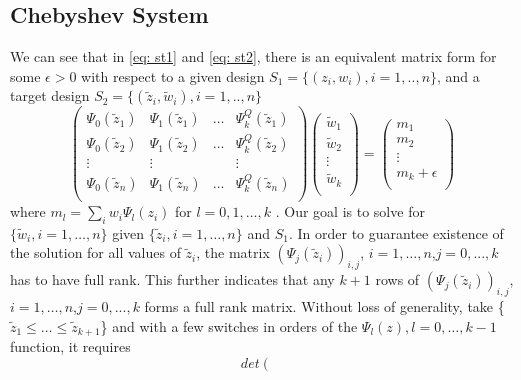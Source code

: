 \documentclass[11pt]{amsart}
\theoremstyle{definition}
\theoremstyle{remark}
\begin{document}
\subsection{Chebyshev System}We can see that in \eqref{eq: st1} and \eqref{eq: st2},  there is an equivalent matrix form for some $\epsilon>0$ with respect to a given design $S_1 = \{(z_i, w_i), i=1,..,n\} $, and a target design  $S_2 = \{(\tilde{z}_i, \tilde{w}_i), i=1,..,n\}$
\begin{equation}\label{eq: tsys1}
\left ( \begin{array}{cccc}

\Psi_{0}(\tilde{z}_1) &\Psi_{1}(\tilde{z}_1)&\ldots &\Psi_{k}^Q(\tilde{z}_1)\\
\Psi_{0}(\tilde{z}_2) &\Psi_{1}(\tilde{z}_2)&\ldots &\Psi_{k}^Q(\tilde{z}_2)\\
\vdots & \vdots &&\vdots\\
\Psi_{0}(\tilde{z}_n) &\Psi_{1}(\tilde{z}_n)&\ldots &\Psi_{k}^Q(\tilde{z}_n)\\
\end{array}\right) \left(\begin{array}{c}
  \tilde{w}_1    \\
   \tilde{w}_2    \\
   \vdots\\
    \tilde{w}_k    \\
      
\end{array}\right) = \left(\begin{array}{c}
  m_1    \\
   m_2    \\
   \vdots\\
    m_k+\epsilon    \\
      
\end{array}\right) 
\end{equation} where $m_l = \sum_{i}w_i\Psi_l(z_i)$ for $l=0,1,\ldots,k$ . Our goal is to solve for $\{\tilde{w}_i, i=1,\ldots,n\}$ given $\{\tilde{z}_i, i=1,\ldots,n\}$ and $S_1$. In order to guarantee existence of the solution for all values of $\tilde{z}_i$, the matrix $\left(\Psi_j(\tilde{z}_i)\right)_{i,j}$, $i=1,\ldots,n$,$j=0,...,k$ has to have full rank. This further indicates that any $k+1$ rows of $\left(\Psi_j(\tilde{z}_i)\right)_{i,j}$, $i=1,\ldots,n$,$j=0,...,k$ forms a full rank matrix. Without loss of generality, take \{$\tilde{z}_1 \le \ldots\le\tilde{z}_{k+1} $\} and with a few switches in orders of the $\Psi_l(z), l=0,\ldots, k-1$ function, it requires\[det\left ( \begin{array}{cccc}\label{eq: tdef1}


\end{array}\]
\end{document}
